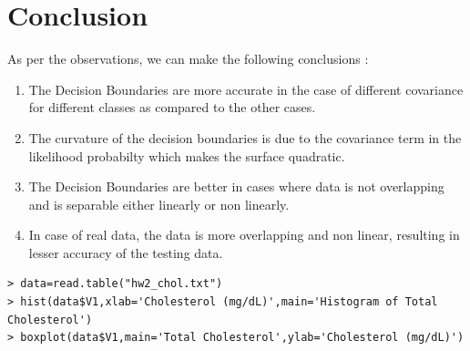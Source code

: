 \documentclass[a4paper]{article}
\begin{document}
\section{Conclusion}
	As per the observations, we can make the following conclusions :
	
	\begin{enumerate}
	  \item The Decision Boundaries are more accurate in the case of different
	  covariance for different classes as compared to the other cases.
	  \item The curvature of the decision boundaries is due to the covariance term
	  in the likelihood probabilty which makes the surface quadratic.
	  \item The Decision Boundaries are better in cases where data is not
	  overlapping and is separable either linearly or non linearly.
	  \item In case of real data, the data is more overlapping and non
	  linear, resulting in lesser accuracy of the testing data.
	\end{enumerate}

\begin{verbatim}
> data=read.table("hw2_chol.txt")
> hist(data$V1,xlab='Cholesterol (mg/dL)',main='Histogram of Total Cholesterol')
> boxplot(data$V1,main='Total Cholesterol',ylab='Cholesterol (mg/dL)')
\end{verbatim}
\end{document}
